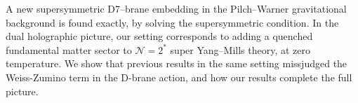 A new supersymmetric D7–brane embedding in the Pilch–Warner gravitational background is found exactly, by solving the supersymmetric condition. 
In the dual holographic picture, our setting corresponds to adding a quenched fundamental matter sector to  $\mathcal{N}=2^*$  super Yang–Mills theory, at zero temperature. We show that previous results in the same setting missjudged the Weiss-Zumino term in the D-brane action, and how our results complete the full picture.
